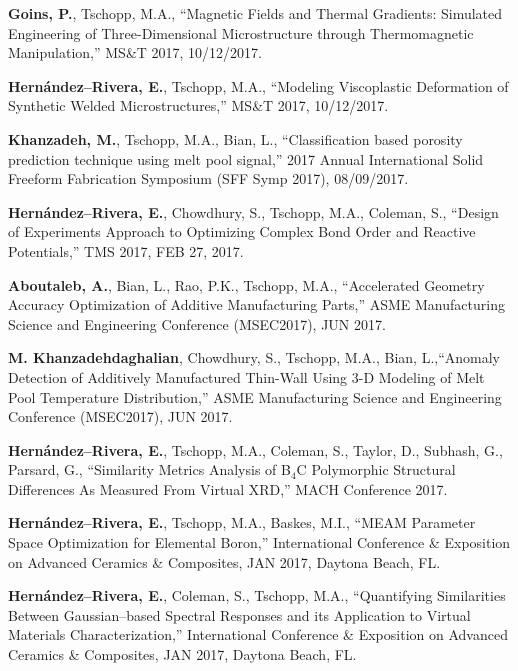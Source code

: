 \begin{cvlist}
\item
\textbf{Goins, P.}, {Tschopp, M.A.}, ``Magnetic Fields and Thermal Gradients: Simulated Engineering of Three-Dimensional Microstructure through Thermomagnetic Manipulation,'' MS\&T 2017, 10/12/2017.

\item
\textbf{Hern\'andez--Rivera, E.}, {Tschopp, M.A.}, ``Modeling Viscoplastic Deformation of Synthetic Welded Microstructures,'' MS\&T 2017, 10/12/2017.

\item
\textbf{Khanzadeh, M.}, Tschopp, M.A., Bian, L., ``Classification based porosity prediction technique using melt pool signal,'' 2017 Annual International Solid Freeform Fabrication Symposium (SFF Symp 2017), 08/09/2017.  

\item
\textbf{Hern\'andez--Rivera, E.}, Chowdhury, S., Tschopp, M.A., Coleman, S., ``Design of Experiments Approach to Optimizing Complex Bond Order and Reactive Potentials,'' TMS 2017, FEB 27, 2017.

\item
\textbf{Aboutaleb, A.}, Bian, L., Rao, P.K., Tschopp, M.A., ``Accelerated Geometry Accuracy Optimization of Additive Manufacturing Parts,'' ASME Manufacturing Science and Engineering Conference (MSEC2017), JUN 2017.

\item
\textbf{M. Khanzadehdaghalian}, Chowdhury, S., Tschopp, M.A., Bian, L.,``Anomaly Detection of Additively Manufactured Thin-Wall Using 3-D Modeling of Melt Pool Temperature Distribution,'' ASME Manufacturing Science and Engineering Conference (MSEC2017), JUN 2017.

\item
\textbf{Hern\'andez--Rivera, E.}, Tschopp, M.A., Coleman, S., Taylor, D., Subhash, G., Parsard, G., ``Similarity Metrics Analysis of B$_4$C Polymorphic Structural Differences As Measured From Virtual XRD,'' MACH Conference 2017.

\item
\textbf{Hern\'andez--Rivera, E.}, Tschopp, M.A., Baskes, M.I., ``MEAM Parameter Space Optimization for Elemental Boron,'' International Conference \& Exposition on Advanced Ceramics \& Composites, JAN 2017, Daytona Beach, FL.

\item
\textbf{Hern\'andez--Rivera, E.}, Coleman, S., Tschopp, M.A., ``Quantifying Similarities Between Gaussian–based Spectral Responses and its Application to Virtual Materials Characterization,'' International Conference \& Exposition on Advanced Ceramics \& Composites, JAN 2017, Daytona Beach, FL.


\end{cvlist}

